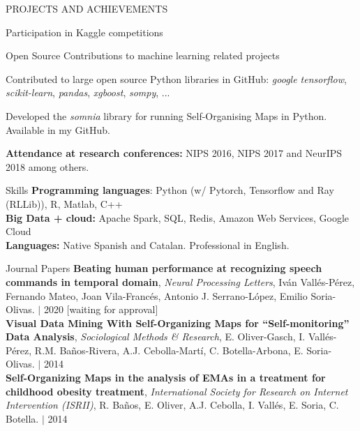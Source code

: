 \documentclass{resume} %
\begin{document}
\begin{rSection}{PROJECTS AND ACHIEVEMENTS}
\begin{rSubsection}{Participation in Kaggle competitions}
\end{rSubsection}

\vspace{-6pt}

\begin{rSubsection}{Open Source Contributions to machine learning related projects}
	{}{}{}  
	
	\vspace{-3pt}
	
	\item Contributed to large open source Python libraries in GitHub: \textit{google tensorflow}, \textit{scikit-learn}, \textit{pandas}, \textit{xgboost}, \textit{sompy}, ... 
	\item Developed the \textit{somnia} library for running Self-Organising Maps in Python. Available in my GitHub.
\end{rSubsection}

\vspace{-6pt}

\textbf{Attendance at research conferences:} NIPS 2016, NIPS 2017 and NeurIPS 2018 among others.


\end{rSection} 



\begin{rSection}{Skills} \itemsep -3pt  
{\textbf{Programming languages}: Python (w/ Pytorch, Tensorflow and Ray (RLLib)), R, Matlab, C++ }  \\
{\textbf{Big Data + cloud:} Apache Spark, SQL, Redis, Amazon Web Services, Google Cloud } \\
{\textbf{Languages:} Native Spanish and Catalan. Professional in English.}
\end{rSection}  
 
\vspace{\fill}




\begin{rSection}{Journal Papers}
{\textbf{Beating human performance at recognizing speech commands in temporal domain}, \textit{Neural Processing Letters}, Iván Vallés-Pérez, Fernando Mateo, Joan Vila-Francés, Antonio J. Serrano-López, Emilio Soria-Olivas. $|$  {2020} [waiting for approval]}\\
{\textbf{Visual Data Mining With Self-Organizing Maps for ``Self-monitoring'' Data Analysis}, \textit{Sociological Methods \& Research}, E. Oliver-Gasch, I. Vallés-Pérez, R.M. Baños-Rivera, A.J. Cebolla-Martí, C. Botella-Arbona, E. Soria-Olivas. $|$  {2014}}\\
{\textbf{Self-Organizing Maps in the analysis of EMAs in a treatment for childhood obesity treatment}, \textit{International Society for Research on Internet Intervention (ISRII)}, R. Baños, E. Oliver, A.J. Cebolla, I. Vallés, E. Soria, C. Botella.  $|$  {2014}}

\end{rSection}
\end{document}
